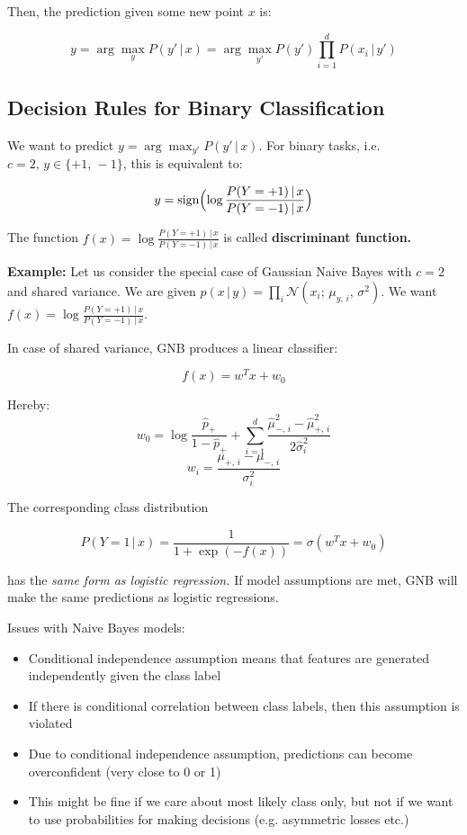\documentclass[a4paper]{extarticle}
\begin{document}
Then, the prediction given some new point $x$ is:

\[
    y = \arg \max_y P(y' \, | \, x) = \arg \max_{y'} P(y') \prod_{i = 1}^d P(x_i \, | \, y')
\]

\subsection{Decision Rules for Binary Classification}

We want to predict $y = \arg \max_{y'} P(y' \, | \, x)$. For binary tasks, i.e. $c = 2, \, y \in \{+1, \, -1\}$, this is equivalent to:

\[
    y = \text{sign}\Bigl(\log \frac{P(Y = +1) \, | \, x}{P(Y = -1) \, | \, x}\Bigr)
\]

The function $f(x) = \log \frac{P(Y = +1) \, | \, x}{P(Y = -1) \, | \, x}$ is called \textbf{discriminant function.}

\textbf{Example:} Let us consider the special case of Gaussian Naive Bayes with $c = 2$ and shared variance. We are given $p(x \, | \, y) = \prod_i \mathcal{N}(x_i; \, \mu_{y, \, i}, \, \sigma^2)$. We want $f(x) = \log \frac{P(Y = +1) \, | \, x}{P(Y = -1) \, | \, x}$.

In case of shared variance, GNB produces a linear classifier:

\[
    f(x) = w^Tx + w_0
\]

Hereby:
\[
    w_0 = \log \frac{\hat{p}_+}{1 - \hat{p}_+} + \sum_{i = 1}^d \frac{\hat{\mu}^2_{-, \, i} - \hat{\mu}^2_{+, \, i}}{2 \hat{\sigma}_i^2}
\]
\[
    w_i = \frac{\mu_{+, \, i} - \mu_{-, \, i}}{\sigma_i^2}
\]

The corresponding class distribution

\[
    P(Y = 1 \, | \, x) = \frac{1}{1 + \exp(-f(x))} = \sigma(w^Tx + w_0)
\]

has the \textit{same form as logistic regression.} If model assumptions are met, GNB will make the same predictions as logistic regressions.

Issues with Naive Bayes models:
\begin{itemize}
    \item Conditional independence assumption means that features are generated independently given the class label
    \item If there is conditional correlation between class labels, then this assumption is violated
    \item Due to conditional independence assumption, predictions can become overconfident (very close to 0 or 1)
    \item This might be fine if we care about most likely class only, but not if we want to use probabilities for making decisions (e.g. asymmetric losses etc.)
\end{itemize}
\end{document}

